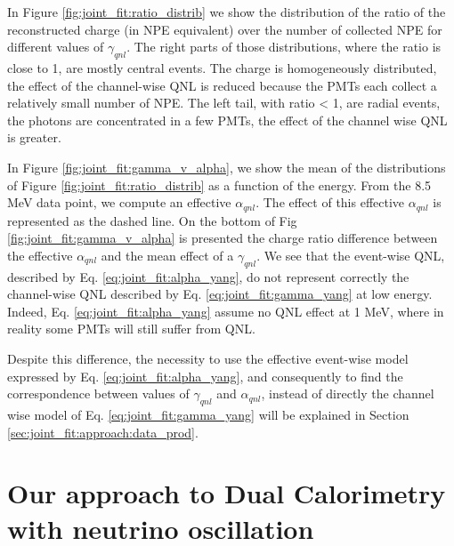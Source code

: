 \documentclass[../main.tex]{subfiles}
\begin{document}
In Figure \ref{fig:joint_fit:ratio_distrib} we show the distribution of the ratio of the reconstructed charge (in NPE equivalent) over the number of collected NPE for different values of $\gamma_{qnl}$. The right parts of those distributions, where the ratio is close to 1, are mostly central events. The charge is homogeneously distributed, the effect of the channel-wise QNL is reduced because the PMTs each collect a relatively small number of NPE. The left tail, with ratio < 1, are radial events, the photons are concentrated in a few PMTs, the effect of the channel wise QNL is greater.

In Figure \ref{fig:joint_fit:gamma_v_alpha}, we show the mean of the distributions of Figure \ref{fig:joint_fit:ratio_distrib} as a function of the energy. From the 8.5 MeV data point, we compute an effective $\alpha_{qnl}$. The effect of this effective $\alpha_{qnl}$ is represented as the dashed line. On the bottom of Fig \ref{fig:joint_fit:gamma_v_alpha} is presented the charge ratio difference between the effective $\alpha_{qnl}$ and the mean effect of a $\gamma_{qnl}$. We see that the event-wise QNL, described by Eq. \ref{eq:joint_fit:alpha_yang}, do not represent correctly the channel-wise QNL described by Eq. \ref{eq:joint_fit:gamma_yang} at low energy. Indeed, Eq. \ref{eq:joint_fit:alpha_yang} assume no QNL effect at 1 MeV, where in reality some PMTs will still suffer from QNL.

Despite this difference, the necessity to use the effective event-wise model expressed by Eq. \ref{eq:joint_fit:alpha_yang}, and consequently to find the correspondence between values of $\gamma_{qnl}$ and $\alpha_{qnl}$, instead of directly the channel wise model of Eq. \ref{eq:joint_fit:gamma_yang} will be explained in Section \ref{sec:joint_fit:approach:data_prod}.

%
%
%

\section{Our approach to Dual Calorimetry with neutrino oscillation}
\label{sec:joint_fit:approach}
\end{document}
